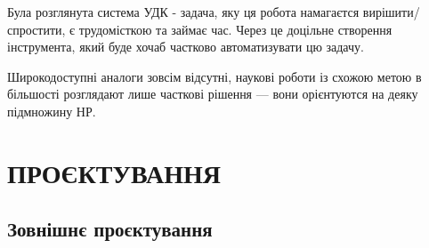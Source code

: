\documentclass[14pt]{extarticle}
\let\oldsection\section
\renewcommand{\section}{\clearpage\oldsection}
\begin{document}
  Була розглянута система УДК - задача,
  яку ця робота намагаєтся вирішити/спростити,
  є трудомісткою та займає час.
  Через це доцільне створення інструмента,
  який буде хочаб частково автоматизувати цю задачу.

  Широкодоступні аналоги зовсім відсутні,
  наукові роботи із схожою метою в більшості розглядают лише часткові рішення
  --- вони орієнтуются на деяку підмножину НР.

  \section{ПРОЄКТУВАННЯ}
  \subsection{Зовнішнє проєктування}
\end{document}
